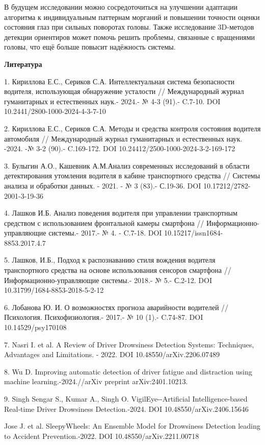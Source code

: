 \documentclass[
]{article}
\begin{document}
В будущем исследовании можно сосредоточиться на улучшении адаптации
алгоритма к индивидуальным паттернам морганий и повышении точности
оценки состояния глаз при сильных поворотах головы. Также исследование
3D-методов детекции ориентиров может помочь решить проблемы, связанные с
вращениями головы, что ещё больше повысит надёжность системы.

\textbf{Литература}

1. Кириллова Е.С., Сериков С.А. Интеллектуальная система безопасности
водителя, использующая обнаружение усталости // Международный журнал
гуманитарных и естественных наук.- 2024.- № 4-3 (91).- C.7-10. DOI
10.2441/2800-1000-2024-4-3-7-10

2. Кириллова Е.С., Сериков С.А. Методы и средства контроля состояния
водителя автомобиля // Международный журнал гуманитарных и естественных
наук. -2024. -№ 3-2 (90).- C.169-172. DOI
10.24412/2500-1000-2024-3-2-169-172

3. Булыгин А.О., Кашевник А.М.Анализ современных исследований в области
детектирования утомления водителя в кабине транспортного средства //
Системы анализа и обработки данных. - 2021. - № 3 (83).- С.19-36. DOI
10.17212/2782-2001-3-19-36

4. Лашков И.Б. Анализ поведения водителя при управлении транспортным
средством с использованием фронтальной камеры смартфона //
Информационно-управляющие системы.- 2017.- № 4. - C.7-18. DOI
10.15217/issn1684-8853.2017.4.7

5. Лашков, И.Б., Подход к распознаванию стиля вождения водителя
транспортного средства на основе использования сенсоров смартфона //
Информационно-управляющие системы.- 2018.- № 5.- С.2-12. DOI
10.31799/1684-8853-2018-5-2-12

6. Лобанова Ю. И. О возможностях прогноза аварийности водителей //
Психология. Психофизиология.- 2017.- № 10 (1).- C.74-87. DOI
10.14529/psy170108

7. Nasri I. et al. A Review of Driver Drowsiness Detection Systems:
Techniques, Advantages and Limitations. - 2022. DOI
10.48550/arXiv.2206.07489

8. Wu D. Improving automatic detection of driver fatigue and distraction
using machine learning.-2024.//arXiv preprint arXiv:2401.10213.

9. Singh Sengar S., Kumar A., Singh O. VigilEye-\/-Artificial
Intelligence-based Real-time Driver Drowsiness Detection.-2024. DOI
10.48550/arXiv.2406.15646

Jose J. et al. SleepyWheels: An Ensemble Model for Drowsiness Detection
leading to Accident Prevention.-2022. DOI 10.48550/arXiv.2211.00718
\end{document}

